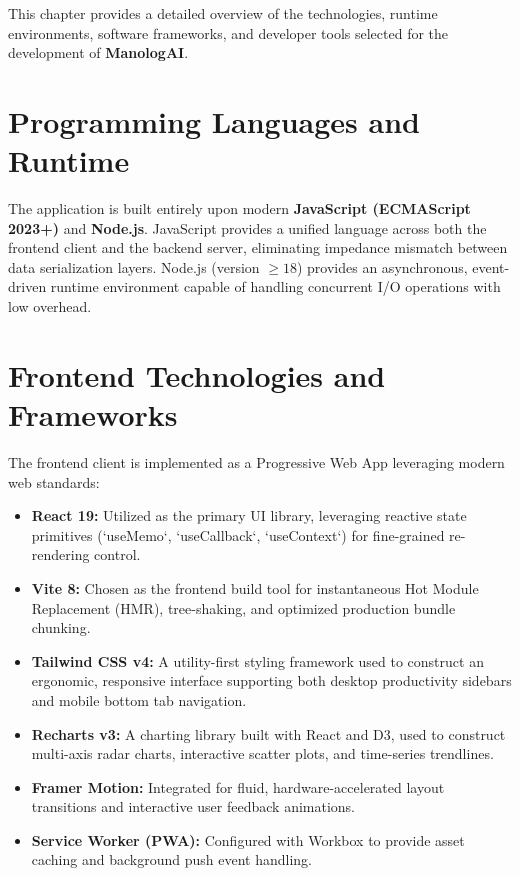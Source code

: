 This chapter provides a detailed overview of the technologies, runtime environments, software frameworks, and developer tools selected for the development of \textbf{ManologAI}.

\section{Programming Languages and Runtime}

The application is built entirely upon modern \textbf{JavaScript (ECMAScript 2023+)} and \textbf{Node.js}. JavaScript provides a unified language across both the frontend client and the backend server, eliminating impedance mismatch between data serialization layers. Node.js (version $\ge 18$) provides an asynchronous, event-driven runtime environment capable of handling concurrent I/O operations with low overhead.

\section{Frontend Technologies and Frameworks}

The frontend client is implemented as a Progressive Web App leveraging modern web standards:
\begin{itemize}
  \item \textbf{React 19:} Utilized as the primary UI library, leveraging reactive state primitives (`useMemo`, `useCallback`, `useContext`) for fine-grained re-rendering control.
  \item \textbf{Vite 8:} Chosen as the frontend build tool for instantaneous Hot Module Replacement (HMR), tree-shaking, and optimized production bundle chunking.
  \item \textbf{Tailwind CSS v4:} A utility-first styling framework used to construct an ergonomic, responsive interface supporting both desktop productivity sidebars and mobile bottom tab navigation.
  \item \textbf{Recharts v3:} A charting library built with React and D3, used to construct multi-axis radar charts, interactive scatter plots, and time-series trendlines.
  \item \textbf{Framer Motion:} Integrated for fluid, hardware-accelerated layout transitions and interactive user feedback animations.
  \item \textbf{Service Worker (PWA):} Configured with Workbox to provide asset caching and background push event handling.
\end{itemize}

